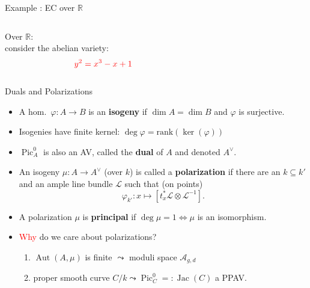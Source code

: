 \documentclass[usenames,dvipsnames,handout]{beamer}
\def\R{\mathbb{R}}
\DeclareMathOperator{\Pic}{Pic}
\DeclareMathOperator{\Aut}{Aut}
\DeclareMathOperator{\Jac}{Jac}
\newcommand{\vphi}{\varphi}
\newcommand{\red}[1]{\textcolor{red}{#1}}
\newcommand{\blue}[1]{\textcolor{blue}{#1}}
\begin{document}
\begin{frame}{ Example : EC over $\R$ }
\vspace{-0.5cm}
\begin{center}
	\begin{columns}
		\begin{column}{0.4\textwidth}
			\onslide<2-> {Over $\R$:\\ 
			consider the abelian variety: 
			\[ \red{y^2 = x^3 -x +1} \]}
			\onslide<3->{Addition law: $P,Q$ {\Large \blue{$\leadsto$}} $P\oplus Q$}
		\end{column}
		\begin{column}{0.5\textwidth}
		\end{column}
	\end{columns}
\end{center}
\end{frame}

\begin{frame}{ Duals and Polarizations }
    \begin{itemize}
     \item A hom.~$\vphi:A\to B$ is an {\bf isogeny} if $\dim A = \dim B$ and $\vphi$ is surjective.
     \pause \item Isogenies have finite kernel:  $\deg\vphi = \mathrm{rank}(\ker(\vphi))$
	 \pause \item $\Pic^0_{A}$ is also an AV, called the {\bf dual} of $A$ and denoted $A^\vee$.	 
	 \pause \item An isogeny $\mu:A\to A^\vee$ (over $k$) is called a {\bf polarization} if 
     there are an $k\subseteq k'$ and an ample line bundle $\mathcal{L}$ such that (on points)
     \[ \vphi_{k'}: x\mapsto [t_x^*\mathcal{L} \otimes\mathcal{L}^{-1} ]. \]
     \vspace{-1.5em}
	 \pause \item A polarization $\mu$ is {\bf principal} if $\deg \mu = 1 \iff \mu$ is an isomorphism.
	 \pause \item \red{Why} do we care about polarizations?
        \begin{enumerate}
    	 \pause \item $\Aut(A,\mu)$ is finite $\leadsto$ moduli space $\mathcal{A}_{g,d}$
    	 \pause \item proper smooth curve $C/k \leadsto \Pic^0_{C}=:\Jac(C)$ a PPAV.
    	\end{enumerate}
	\end{itemize}
\end{frame}
\end{document}
